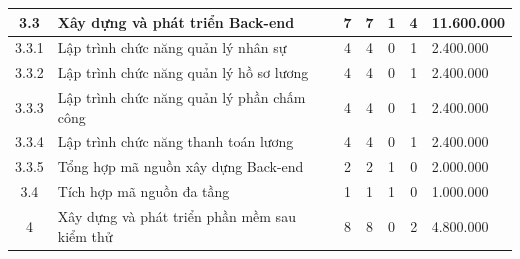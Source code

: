 \begin{longtable}{|c|p{3cm}|c|c|c|c|p{3cm}|}
    3.3                             & Xây dựng và phát triển Back-end                               & 7                                              & 7                                               & 1                                                               & 4                  & 11.600.000 \\ \hline
    3.3.1                           & Lập trình chức năng quản lý nhân sự                           & 4                                              & 4                                               & 0                                                               & 1                  & 2.400.000  \\ \hline
    3.3.2                           & Lập trình chức năng quản lý hồ sơ lương                       & 4                                              & 4                                               & 0                                                               & 1                  & 2.400.000  \\ \hline
    3.3.3                           & Lập trình chức năng quản lý phần chấm công                    & 4                                              & 4                                               & 0                                                               & 1                  & 2.400.000  \\ \hline
    3.3.4                           & Lập trình chức năng thanh toán lương                          & 4                                              & 4                                               & 0                                                               & 1                  & 2.400.000  \\ \hline
    3.3.5                           & Tổng hợp mã nguồn xây dựng Back-end                           & 2                                              & 2                                               & 1                                                               & 0                  & 2.000.000  \\ \hline
    3.4                             & Tích hợp mã nguồn đa tầng                                     & 1                                              & 1                                               & 1                                                               & 0                  & 1.000.000  \\ \hline
    4                               & Xây dựng và phát triển phần mềm sau kiểm thử                  & 8                                              & 8                                               & 0                                                               & 2                  & 4.800.000  \\ \hline

\end{longtable}
